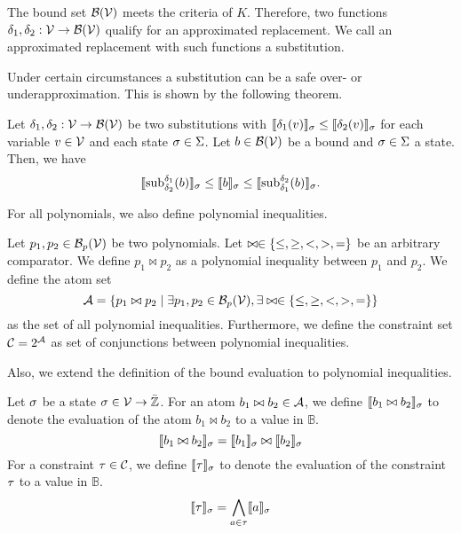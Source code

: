 The bound set $\mathcal{B}(\mathcal{V})$ meets the criteria of $K$.
Therefore, two functions $\delta_1, \delta_2: \mathcal{V} \rightarrow \mathcal{B}(\mathcal{V})$ qualify for an approximated replacement.
We call an approximated replacement with such functions a substitution.


Under certain circumstances a substitution can be a safe over- or underapproximation.
This is shown by the following theorem.


\begin{theorem}
  Let $\delta_1, \delta_2: \mathcal{V} \rightarrow \mathcal{B}(\mathcal{V})$ be two substitutions with $\llbracket \delta_1(v) \rrbracket_{\sigma} \leq \llbracket \delta_2(v) \rrbracket_{\sigma}$ for each variable $v \in \mathcal{V}$ and each state $\sigma \in \Sigma$.
  Let $b \in \mathcal{B}(\mathcal{V})$ be a bound and $\sigma \in \Sigma$ a state.
  Then, we have
  \[ \llbracket \text{sub}_{\delta_2}^{\delta_1}(b) \rrbracket_{\sigma} \leq \llbracket b \rrbracket_{\sigma} \leq \llbracket \text{sub}_{\delta_1}^{\delta_2}(b) \rrbracket_{\sigma}. \]
\end{theorem}
For all polynomials, we also define polynomial inequalities.

\begin{definition}
  Let $p_1, p_2 \in \mathcal{B}_p(\mathcal{V})$ be two polynomials.
  Let $\bowtie \in \lbrace \leq, \geq, <, >, = \rbrace$ be an arbitrary comparator.
  We define $p_1 \bowtie p_2$ as a polynomial inequality between $p_1$ and $p_2$.
  We define the atom set
  \[ \mathcal{A} = \lbrace p_1 \bowtie p_2 \mid \exists p_1, p_2 \in \mathcal{B}_p(\mathcal{V}), \exists \bowtie \in \lbrace \leq, \geq, <, >, = \rbrace \rbrace \]
  as the set of all polynomial inequalities.
  Furthermore, we define the constraint set $\mathcal{C} = 2^{\mathcal{A}}$ as set of conjunctions between polynomial inequalities.
\end{definition}
Also, we extend the definition of the bound evaluation to polynomial inequalities.

\begin{definition}
  Let $\sigma$ be a state $\sigma \in \mathcal{V} \rightarrow \bar{\mathbb{Z}}$.
  For an atom $b_1 \bowtie b_2 \in \mathcal{A}$, we define $\llbracket b_1 \bowtie b_2 \rrbracket_{\sigma}$ to denote the evaluation of the atom $b_1 \bowtie b_2$ to a value in $\mathbb{B}$.
  \[ \llbracket b_1 \bowtie b_2 \rrbracket_{\sigma} = \llbracket b_1 \rrbracket_{\sigma} \bowtie \llbracket b_2 \rrbracket_{\sigma} \]
  For a constraint $\tau \in \mathcal{C}$, we define $\llbracket \tau \rrbracket_{\sigma}$ to denote the evaluation of the constraint $\tau$ to a value in $\mathbb{B}$.
  \[ \llbracket \tau \rrbracket_{\sigma} = \bigwedge_{a \in \tau} \llbracket a \rrbracket_{\sigma} \]
\end{definition}
